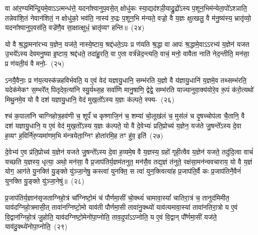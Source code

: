 वा आ॑र॒ण्यमि॑न्द्रि॒यमे॒वा\-ऽऽ\-त्मन्ध॑त्ते॒ यदना᳚श्वानुप॒वसे॒त् क्षोधु॑कः स्या॒द्यद॑श्ञी॒याद्रु॒द्रो᳚\-ऽस्य प॒शून॒भिम॑न्येता॒पो᳚\-ऽश्ञाति॒ तन्नेवा॑शि॒तं नेवान॑शितं॒ न क्षोधु॑को॒ भव॑ति॒ नास्य॑ रु॒द्रः प॒शून॒भि म॑न्यते॒ वज्रो॒ वै य॒ज्ञः क्षुत्खलु॒ वै म॑नु॒ष्य॑स्य॒ भ्रातृ॑व्यो॒ यदना᳚श्वानुप॒वस॑ति॒ वज्रे॑णै॒व सा॒क्षात्क्षुधं॒ भ्रातृ॑व्यꣳ हन्ति॥~(२४)\ip

{\anuvakamend[{परि॑ मनु॒ष्या॑ इन्द्रि॒यꣳ सा॒क्षात् त्रीणि॑ च}]}

यो वै श्र॒द्धामना॑रभ्य य॒ज्ञेन॒ यज॑ते॒ नास्ये॒ष्टाय॒ श्रद्द॑धते॒\-ऽपः प्र ण॑यति श्र॒द्धा वा आपः॑ श्र॒द्धामे॒वा\-ऽऽ\-रभ्य॑ य॒ज्ञेन॑ यजत उ॒भये᳚\-ऽस्य देवमनु॒ष्या इ॒ष्टाय॒ श्रद्द॑धते॒ तदा॑हु॒रति॒ वा ए॒ता वर्त्र॑न्नेद॒न्त्यति॒ वाचं॒ मनो॒ वावैता नाति॑ नेद॒न्तीति॒ मन॑सा॒ प्र ण॑यती॒यं वै मनो॒-~(२५)\ip

ऽनयै॒वैनाः॒ प्र ण॑य॒त्यस्क॑न्नहविर्भवति॒ य ए॒वं वेद॑ यज्ञायु॒धानि॒ सम्भ॑रति य॒ज्ञो वै य॑ज्ञायु॒धानि॑ य॒ज्ञमे॒व तथ्सम्भ॑रति॒ यदेक॑मेकꣳ स॒म्भरे᳚त् पितृदेव॒त्या॑नि स्यु॒र्यथ्स॒ह सर्वा॑णि मानु॒षाणि॒ द्वेद्वे॒ सम्भ॑रति याज्यानुवा॒क्य॑योरे॒व रू॒पं क॑रो॒त्यथो॑ मिथु॒नमे॒व यो वै दश॑ यज्ञायु॒धानि॒ वेद॑ मुख॒तो᳚\-ऽस्य य॒ज्ञः क॑ल्पते॒ स्फ्य-~(२६)\ip

श्च॑ क॒पाला॑नि चाग्निहोत्र॒हव॑णी च॒ शूर्पं॑ च कृष्णाजि॒नं च॒ शम्या॑ चो॒लूख॑लं च॒ मुस॑लं च दृ॒षच्चोप॑ला चै॒तानि॒ वै दश॑ यज्ञायु॒धानि॒ य ए॒वं वेद॑ मुख॒तो᳚\-ऽस्य य॒ज्ञः क॑ल्पते॒ यो वै दे॒वेभ्यः॑ प्रति॒प्रोच्य॑ य॒ज्ञेन॒ यज॑ते जु॒षन्ते᳚\-ऽस्य दे॒वा ह॒व्यꣳ ह॒विर्नि॑रु॒प्यमा॑णम॒भि म॑न्त्रयेता॒ग्निꣳ होता॑रमि॒ह तꣳ हु॑व॒ इति॑~(२७)\ip

दे॒वेभ्य॑ ए॒व प्र॑ति॒प्रोच्य॑ य॒ज्ञेन॑ यजते जु॒षन्ते᳚\-ऽस्य दे॒वा ह॒व्यमे॒ष वै य॒ज्ञस्य॒ ग्रहो॑ गृही॒त्वैव य॒ज्ञेन॑ यजते॒ तदु॑दि॒त्वा वाचं॑ यच्छति य॒ज्ञस्य॒ धृत्या॒ अथो॒ मन॑सा॒ वै प्र॒जा\-प॑तिर्य॒ज्ञम॑तनुत॒ मन॑सै॒व तद्य॒ज्ञं त॑नुते॒ रक्ष॑सा॒मन॑न्ववचाराय॒ यो वै य॒ज्ञं योग॒ आग॑ते यु॒नक्ति॑ यु॒ङ्क्ते यु॑ञ्जा॒नेषु॒ कस्त्वा॑ युनक्ति॒ स त्वा॑ युन॒क्त्वित्या॑ह प्र॒जा\-प॑ति॒र्वै कः प्र॒जा\-प॑तिनै॒वैनं॑ युनक्ति यु॒ङ्क्ते यु॑ञ्जा॒नेषु॑॥~(२८)\ip

{\anuvakamend[{वै मनः॒ स्फ्य इति॑ युन॒क्त्वेका॑\-दश च}]}

प्र॒जा\-प॑तिर्य॒ज्ञान॑सृजता\-ग्निहो॒त्रं चा᳚ग्निष्टो॒मं च॑ पौर्णमा॒सीं चो॒क्थ्यं॑ चामावा॒स्यां᳚ चातिरा॒त्रं च॒ तानुद॑मिमीत॒ याव॑दग्निहो॒त्रमासी॒त् तावा॑नग्निष्टो॒मो याव॑ती पौर्णमा॒सी तावा॑नु॒क्थ्यो॑ याव॑त्यमावा॒स्या॑ तावा॑नतिरा॒त्रो य ए॒वं वि॒द्वान॑ग्निहो॒त्रं जु॒होति॒ याव॑दग्निष्टो॒मेनो॑पा॒प्नोति॒ ताव॒दुपा᳚\-ऽऽ\-प्नोति॒ य ए॒वं वि॒द्वान् पौ᳚र्णमा॒सीं यज॑ते॒ याव॑दु॒क्थ्ये॑नो\-पा॒प्नोति॒~(२९)\ip

